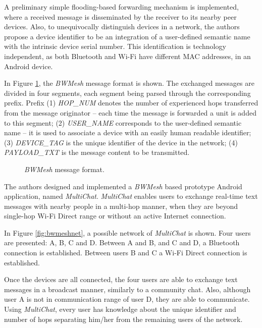 A preliminary simple flooding-based forwarding mechanism is implemented, where a received message is disseminated by the receiver to its nearby peer devices. Also, to unequivocally distinguish devices in a network, the authors propose a device identifier to be an integration of a user-defined semantic name with the intrinsic device serial number. This identification is technology independent, as both Bluetooth and Wi-Fi have different \gls{MAC} addresses, in an Android device.

In Figure \ref{fig:bwmsg}, the \textit{BWMesh} message format is shown. The exchanged messages are divided in four segments, each segment being parsed through the corresponding prefix. Prefix (1) \textit{HOP\_NUM} denotes the number of experienced hops transferred from the message originator -- each time the message is forwarded a unit is added to this segment; (2) \textit{USER\_NAME} corresponds to the user-defined semantic name -- it is used to associate a device with an easily human readable identifier; (3) \textit{DEVICE\_TAG} is the unique identifier of the device in the network; (4) \textit{PAYLOAD\_TXT} is the message content to be transmitted.

\begin{figure}[ht]
	\noindent{}
	\caption{\label{fig:bwmsg} \textit{BWMesh} message format.}
\end{figure}

The authors designed and implemented a \textit{BWMesh} based prototype Android application, named \textit{MultiChat}. \textit{MultiChat} enables users to exchange real-time text messages with nearby people in a multi-hop manner, when they are beyond single-hop Wi-Fi Direct range or without an active Internet connection.

In Figure \ref{fig:bwmeshnet}, a possible network of \textit{MultiChat} is shown. Four users are presented: A, B, C and D. Between A and B, and C and D, a Bluetooth connection is established. Between users B and C a Wi-Fi Direct connection is established.

Once the devices are all connected, the four users are able to exchange text messages in a broadcast manner, similarly to a community chat. Also, although user A is not in communication range of user D, they are able to communicate. Using \textit{MultiChat}, every user has knowledge about the unique identifier and number of hops separating him/her from the remaining users of the network.

